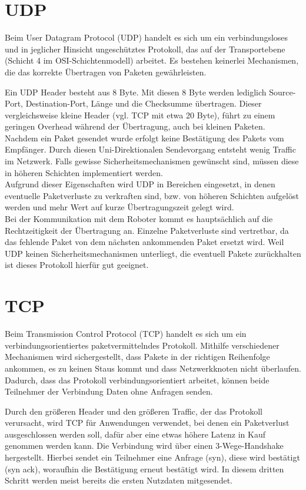 \section{UDP}
Beim User Datagram Protocol (UDP) handelt es sich um ein verbindungsloses und in jeglicher Hinsicht ungeschütztes Protokoll, das auf der Transportebene (Schicht 4 im OSI-Schichtenmodell) arbeitet. Es bestehen keinerlei Mechanismen, die das korrekte Übertragen von Paketen gewährleisten. 

Ein UDP Header besteht aus 8 Byte. Mit diesen 8 Byte werden lediglich Source-Port, Destination-Port, Länge und die Checksumme übertragen. Dieser vergleichsweise kleine Header (vgl. TCP mit etwa 20 Byte), führt zu einem geringen Overhead während der Übertragung, auch bei kleinen Paketen. Nachdem ein Paket gesendet wurde erfolgt keine Bestätigung des Pakets vom Empfänger. Durch diesen Uni-Direktionalen Sendevorgang entsteht wenig Traffic im Netzwerk. Falls gewisse Sicherheitsmechanismen gewünscht sind, müssen diese in höheren Schichten implementiert werden. \\
Aufgrund dieser Eigenschaften wird UDP in Bereichen eingesetzt, in denen eventuelle Paketverluste zu verkraften sind, bzw. von höheren Schichten aufgelöst werden und mehr Wert auf kurze Übertragungszeit gelegt wird.\\

Bei der Kommunikation mit dem Roboter kommt es hauptsächlich auf die Rechtzeitigkeit der Übertragung an. Einzelne Paketverluste sind vertretbar, da das fehlende Paket von dem nächsten ankommenden Paket ersetzt wird. Weil UDP keinen Sicherheitsmechanismen unterliegt, die eventuell Pakete zurückhalten ist dieses Protokoll hierfür gut geeignet.


\section{TCP}
Beim Transmission Control Protocol (TCP) handelt es sich um ein verbindungsorientiertes paketvermittelndes Protokoll. Mithilfe verschiedener Mechanismen wird sichergestellt, dass Pakete in der richtigen Reihenfolge ankommen, es zu keinen Staus kommt und dass Netzwerkknoten nicht überlaufen. Dadurch, dass das Protokoll verbindungsorientiert arbeitet, können beide Teilnehmer der Verbindung Daten ohne Anfragen senden. 

Durch den größeren Header und den größeren Traffic, der das Protokoll verursacht, wird TCP für Anwendungen verwendet, bei denen ein Paketverlust ausgeschlossen werden soll, dafür aber eine etwas höhere Latenz in Kauf genommen werden kann. 
Die Verbindung wird über einen 3-Wege-Handshake hergestellt. Hierbei sendet ein Teilnehmer eine Anfrage (syn), diese wird bestätigt (syn ack), woraufhin die Bestätigung erneut bestätigt wird. In diesem dritten Schritt werden meist bereits die ersten Nutzdaten mitgesendet.

